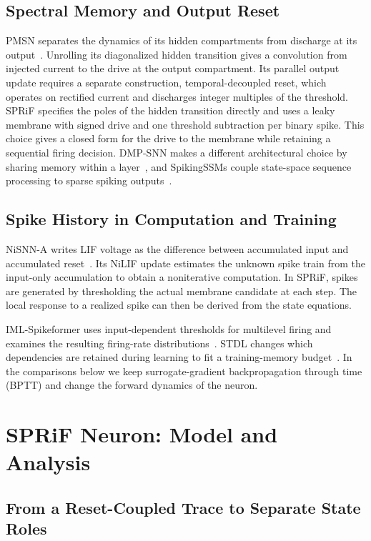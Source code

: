 \documentclass[letterpaper,journal]{IEEEtran}
\begin{document}
\subsection{Spectral Memory and Output Reset}

PMSN separates the dynamics of its hidden compartments from discharge at its output~\cite{pmsn2026}. Unrolling its diagonalized hidden transition gives a convolution from injected current to the drive at the output compartment. Its parallel output update requires a separate construction, temporal-decoupled reset, which operates on rectified current and discharges integer multiples of the threshold. SPRiF specifies the poles of the hidden transition directly and uses a leaky membrane with signed drive and one threshold subtraction per binary spike. This choice gives a closed form for the drive to the membrane while retaining a sequential firing decision. DMP-SNN makes a different architectural choice by sharing memory within a layer~\cite{sun2026dmp}, and SpikingSSMs couple state-space sequence processing to sparse spiking outputs~\cite{spikingssms}.

\subsection{Spike History in Computation and Training}

NiSNN-A writes LIF voltage as the difference between accumulated input and accumulated reset~\cite{nisnna2025}. Its NiLIF update estimates the unknown spike train from the input-only accumulation to obtain a noniterative computation. In SPRiF, spikes are generated by thresholding the actual membrane candidate at each step. The local response to a realized spike can then be derived from the state equations.

IML-Spikeformer uses input-dependent thresholds for multilevel firing and examines the resulting firing-rate distributions~\cite{imlspikeformer2026}. STDL changes which dependencies are retained during learning to fit a training-memory budget~\cite{stdl2026}. In the comparisons below we keep surrogate-gradient backpropagation through time (BPTT) and change the forward dynamics of the neuron.

\section{SPRiF Neuron: Model and Analysis}
\label{sec:model}

\subsection{From a Reset-Coupled Trace to Separate State Roles}
\label{sec:motivation}
\end{document}
